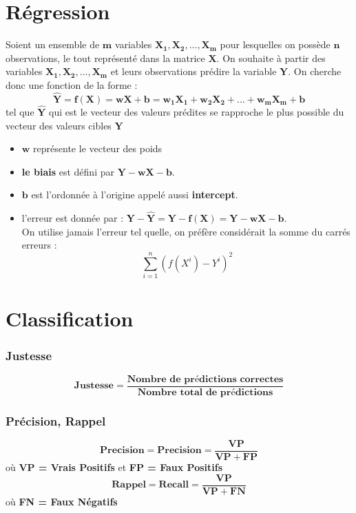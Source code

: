 \documentclass[french]{article}
\begin{document}
	
	\section{Régression}
Soient un ensemble de $\bm{m}$ variables $\bm{X_{1},X_{2},...,X_{m}}$ pour lesquelles on possède $\bm{n}$ observations, le tout représenté dans la matrice $\bm{X}$. On souhaite à partir des variables $\bm{X_{1},X_{2},...,X_{m}}$ et leurs observations prédire la variable $\bm{Y}$. On cherche donc une fonction de la forme : 
$$
\bm{\hat{Y}=f(X)=wX+b=w_{1}X_{1}+w_{2}X_{2}+...+w_{m}X_{m}+b}
$$
tel que $\bm{\hat{Y}}$ qui est le vecteur des valeurs prédites se rapproche le plus possible du vecteur des valeurs cibles $\bm{Y}$
\begin{itemize}[label = \textbullet]
	\item $\bm{w}$ représente le vecteur des poids
	\item \textbf{le biais} est défini par $\bm{Y-wX-b}$.
	\item $\bm{b}$ est l'ordonnée à l'origine appelé aussi \textbf{intercept}.
	\item l'erreur est donnée par : $\bm{Y-\hat{Y}=Y-f(X)=Y-wX-b}$.\\
	On utilise jamais l'erreur tel quelle, on préfère considérait la somme du carrés erreurs : 
	$$\sum_{i=1}^{n}(f(X^{i})-Y^{i})^{2}$$  
\end{itemize}
	
	\section{Classification}
	\subsubsection{Justesse}
	$$\bm{Justesse=\frac{\text{Nombre de prédictions correctes}}{\text{Nombre total de prédictions}}}$$
	\subsubsection{Précision, Rappel}
	$$\bm{Precision = Precision =\frac{VP}{VP+FP}}$$
	où \textbf{VP = Vrais Positifs} et \textbf{FP = Faux Positifs}
	$$\bm{Rappel = Recall = \frac{VP}{VP+FN}}$$
	où \textbf{FN = Faux Négatifs}
\end{document}
